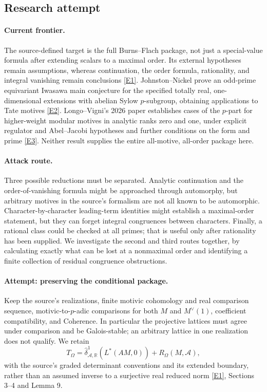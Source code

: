 \documentclass[11pt,a4paper]{article}
\newcommand{\R}{\mathbb{R}}
\newcommand{\eref}[2]{\hyperlink{extra:#1:#2}{[E#2]}}
\numberwithin{equation}{section}
\begin{document}
\subsection{Research attempt}

\paragraph{Current frontier.}
The source-defined target is the full Burns--Flach package, not just a special-value formula after extending scalars to a maximal order. Its external hypotheses remain assumptions, whereas continuation, the order formula, rationality, and integral vanishing remain conclusions \eref{58}{1}. Johnston--Nickel prove an odd-prime equivariant Iwasawa main conjecture for the specified totally real, one-dimensional extensions with abelian Sylow $p$-subgroup, obtaining applications to Tate motives \eref{58}{2}. Longo--Vigni's 2026 paper establishes cases of the $p$-part for higher-weight modular motives in analytic ranks zero and one, under explicit regulator and Abel--Jacobi hypotheses and further conditions on the form and prime \eref{58}{3}. Neither result supplies the entire all-motive, all-order package here.

\paragraph{Attack route.}
Three possible reductions must be separated. Analytic continuation and the order-of-vanishing formula might be approached through automorphy, but arbitrary motives in the source's formalism are not all known to be automorphic. Character-by-character leading-term identities might establish a maximal-order statement, but they can forget integral congruences between characters. Finally, a rational class could be checked at all primes; that is useful only after rationality has been supplied. We investigate the second and third routes together, by calculating exactly what can be lost at a nonmaximal order and identifying a finite collection of residual congruence obstructions.

\paragraph{Attempt: preserving the conditional package.}
Keep the source's realizations, finite motivic cohomology and real comparison sequence, motivic-to-$p$-adic comparisons for both $M$ and $M^\vee(1)$, coefficient compatibility, and Coherence. In particular the projective lattices must agree under comparison and be Galois-stable; an arbitrary lattice in one realization does not qualify. We retain
\[
 T_\Omega=\widehat\delta^1_{\mathcal A,\R}(L^*(AM,0))
                       +R_\Omega(M,\mathcal A),
\]
with the source's graded determinant conventions and its extended boundary, rather than an assumed inverse to a surjective real reduced norm \eref{58}{1}, Sections 3--4 and Lemma 9.
\end{document}
